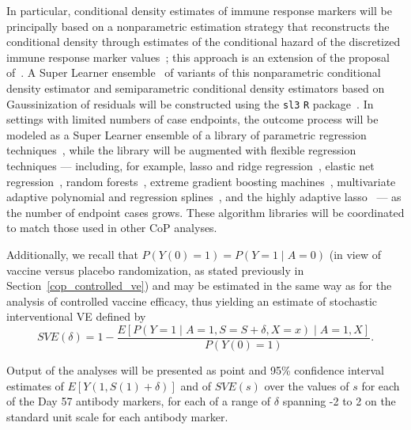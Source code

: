 In particular, conditional density estimates of immune response markers will be
principally based on a nonparametric estimation strategy that reconstructs the
conditional density through estimates of the conditional hazard of the
discretized immune response marker values~\citep{hejazi2020efficient,
hejazi2020efficient, hejazi2020haldensify}; this approach is an extension
of the proposal of~\citet{diaz2011super}. A Super Learner
ensemble~\citep{vdl2007super} of variants of this nonparametric
conditional density estimator and semiparametric conditional density estimators
based on Gaussinization of residuals will be constructed using the \texttt{sl3}
\texttt{R} package~\citep{coyle2020sl3}. In settings with limited numbers of
case endpoints, the outcome process will be modeled as a Super Learner ensemble
of a library of parametric regression techniques~\citep[as recommend
by][]{gruber2010application}, while the library will be augmented with flexible
regression techniques --- including, for example, lasso and ridge
regression~\citep{tibshirani1996regression,tikhonov1977solutions,hoerl1970ridge},
elastic net regression~\citep{zou2003regression,friedman2009glmnet}, random
forests~\citep{breiman2001random, wright2017ranger}, extreme gradient boosting
machines~\citep{chen2016xgboost}, multivariate adaptive polynomial and regression
splines~\citep{friedman1991multivariate, stone1994use,
kooperberg1997polychotomous}, and the highly adaptive
lasso~\citep{vdl2017generally,benkeser2016highly,hejazi2020hal9001-joss} --- as
the number of endpoint cases grows. These algorithm libraries will be
coordinated to match those used in other CoP analyses.

Additionally, we recall that $P(Y(0)=1) = P(Y=1 \mid A=0)$ (in view of vaccine
versus placebo randomization, as stated previously in
Section~\ref{cop_controlled_ve}) and may be estimated in the same way as for the
analysis of controlled vaccine efficacy, thus yielding an estimate of
stochastic interventional VE defined by $$ SVE(\delta) = 1 - \frac{E[P(Y
= 1 \mid A = 1, S = S + \delta, X = x) \mid A = 1, X]}{P(Y(0)=1)}.$$

Output of the analyses will be presented as point and 95\% confidence interval
estimates of $E[Y(1, S(1) + \delta)]$ and of $SVE(s)$ over the values of $s$ for
each of the Day 57 antibody markers, for each of a range of $\delta$ spanning -2
to 2 on the standard unit scale for each antibody marker.

